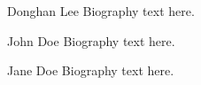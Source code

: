 \documentclass[journal]{IEEEtran}
\begin{document}
	
	
	
	\begin{IEEEbiography}{Donghan Lee}
		Biography text here.
	\end{IEEEbiography}
	
	\begin{IEEEbiographynophoto}{John Doe}
		Biography text here.
	\end{IEEEbiographynophoto}
	
	
	\begin{IEEEbiographynophoto}{Jane Doe}
		Biography text here.
	\end{IEEEbiographynophoto}
\end{document}
